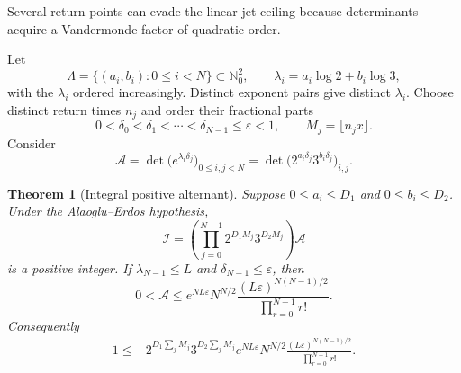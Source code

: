 \documentclass[11pt]{article}
\newtheorem{theorem}{Theorem}[section]
\theoremstyle{definition}
\theoremstyle{remark}
\newcommand{\NN}{\mathbb N}
\begin{document}
Several return points can evade the linear jet ceiling because determinants acquire a Vandermonde factor of quadratic order.

Let
\[
 \Lambda=\{(a_i,b_i):0\le i<N\}\subset\NN_0^2,
 \qquad
 \lambda_i=a_i\log2+b_i\log3,
\]
with the $\lambda_i$ ordered increasingly. Distinct exponent pairs give distinct $\lambda_i$. Choose distinct return times $n_j$ and order their fractional parts
\[
 0<\delta_0<\delta_1<\cdots<\delta_{N-1}\le\varepsilon<1,
 \qquad M_j=\lfloor n_jx\rfloor.
\]
Consider
\begin{equation}\label{eq:alternant}
 \mathcal A=\det\bigl(e^{\lambda_i\delta_j}\bigr)_{0\le i,j<N}
 =\det\bigl(2^{a_i\delta_j}3^{b_i\delta_j}\bigr)_{i,j}.
\end{equation}

\begin{theorem}[Integral positive alternant]\label{thm:alternant}
Suppose $0\le a_i\le D_1$ and $0\le b_i\le D_2$. Under the Alaoglu--Erdos hypothesis,
\begin{equation}\label{eq:alternant-integer}
 \mathcal I=
 \left(\prod_{j=0}^{N-1}2^{D_1M_j}3^{D_2M_j}\right)\mathcal A
\end{equation}
is a positive integer. If $\lambda_{N-1}\le L$ and $\delta_{N-1}\le\varepsilon$, then
\begin{equation}\label{eq:alternant-upper}
 0<\mathcal A\le
 e^{NL\varepsilon}N^{N/2}
 \frac{(L\varepsilon)^{N(N-1)/2}}
 {\prod_{r=0}^{N-1}r!}.
\end{equation}
Consequently
\begin{align}
 1\le{}&
 2^{D_1\sum_jM_j}3^{D_2\sum_jM_j}
 e^{NL\varepsilon}N^{N/2}
 \frac{(L\varepsilon)^{N(N-1)/2}}
 {\prod_{r=0}^{N-1}r!}.
 \label{eq:alternant-master-ineq}
\end{align}
\end{theorem}
\end{document}
